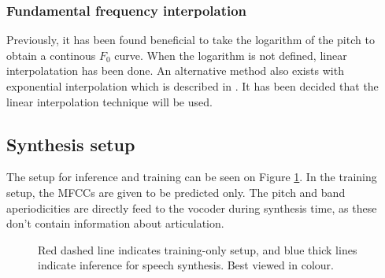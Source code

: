 \documentclass[a4paper]{article}
\begin{document}
\subsubsection{Fundamental frequency interpolation}

Previously, it has been found beneficial to take the logarithm of the
pitch to obtain a continous \( F_0 \) curve.
When the logarithm is not defined, linear  interpolatation has been done. \cite{Gonzalez2017}
An alternative method also exists with exponential interpolation
which is described in \cite{Chen1997}. It has been decided that the
linear interpolation technique will be used. 

\subsection{Synthesis setup}

The setup for inference and training can be seen on Figure \ref{fig:structure}.
In the training setup, the MFCCs are given to be predicted only. The pitch and band aperiodicities
are directly feed to the vocoder during synthesis time, as these don't contain information about articulation. 

\begin{figure}
  \caption{Red dashed line indicates training-only setup, and blue thick lines indicate inference for speech synthesis. Best viewed in colour.}
  \label{fig:structure}
\end{figure}
\end{document}
